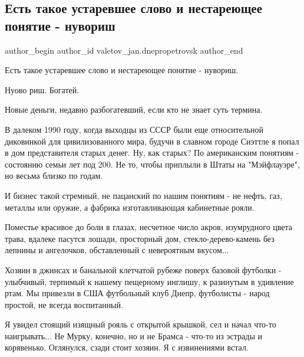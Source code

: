  
 
 
 
 
 
\subsection{Есть такое устаревшее слово и нестареющее понятие - нувориш}
\label{sec:25_11_2021.fb.valetov_jan.dnepropetrovsk.1.nuvorish}
 
\ifcmt
 author_begin
   author_id valetov_jan.dnepropetrovsk
 author_end
\fi

Есть такое устаревшее слово и нестареющее понятие - нувориш.

Нуово риш. Богатей. 

Новые деньги, недавно разбогатевший, если кто не знает суть термина.

В далеком 1990 году, когда выходцы из СССР были еще относительной диковинкой
для цивилизованного мира, будучи в славном городе Сиэттле я попал в дом
представителя старых денег. Ну, как старых? По американским понятиям -
состоянию семьи лет под 200. Не то, чтобы приплыли в Штаты на "Мэйфлауэре", но
весьма близко по годам.

И бизнес такой стремный, не пацанский по нашим понятиям - не нефть, газ,
металлы или оружие, а фабрика изготавливающая кабинетные рояли. 

Поместье красивое до боли в глазах, несчетное число акров, изумрудного цвета
трава, вдалеке пасутся лошади, просторный дом, стекло-дерево-камень без лепнины
и ангелочков, обставленный с невероятным вкусом... 

Хозяин в джинсах и банальной клетчатой рубеже поверх базовой футболки -
улыбчивый, терпимый к нашему пещерному инглишу, к разинутым в удивление ртам.
Мы привезли в США футбольный клуб Днепр, футболисты - народ простой, не всегда
воспитанный.

Я увидел стоящий изящный рояль с открытой крышкой, сел и начал что-то
наигрывать... Не Мурку, конечно, но и не Брамса -  что-то из эстрады и
корявенько. Оглянулся, сзади стоит хозяин. Я с извинениями встал. 


